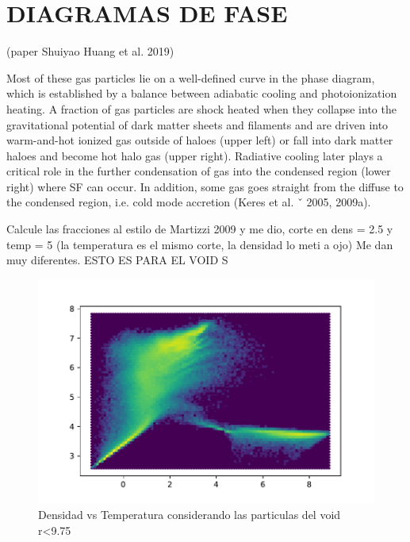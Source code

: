 
\chapter{DIAGRAMAS DE FASE} %

(paper Shuiyao Huang et al. 2019) 



Most of these
gas particles lie on a well-defined curve in the phase diagram,
which is established by a balance between adiabatic cooling and photoionization heating. A fraction of gas particles are shock heated
when they collapse into the gravitational potential of dark matter
sheets and filaments and are driven into warm-and-hot ionized gas
outside of haloes (upper left) or fall into dark matter haloes and
become hot halo gas (upper right). Radiative cooling later plays a
critical role in the further condensation of gas into the condensed
region (lower right) where SF can occur. In addition, some gas goes
straight from the diffuse to the condensed region, i.e. cold mode
accretion (Keres et al. ˇ 2005, 2009a).



Calcule las fracciones al estilo de Martizzi 2009 y me dio, corte en dens = 2.5 y temp = 5 (la temperatura es el mismo corte, la densidad lo meti a ojo) Me dan muy diferentes. ESTO ES PARA EL VOID S
\begin{figure}[h]
\centering
\includegraphics[width=14cm]{Figures/S1373_diagfaseVOID.pdf}
\decoRule
\caption[Diagrama de Fase TODAS particulas]{Densidad vs Temperatura considerando las particulas del void r<9.75}
\label{fig:Electron}
\end{figure}


